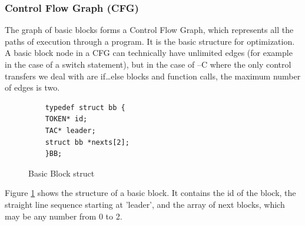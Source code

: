 \documentclass[12pt]{article}
\begin{document}
\subsubsection{Control Flow Graph (CFG)}
The graph of basic blocks forms a Control Flow Graph\supercite{cfg}, which represents all the paths of execution through a program. It is the basic structure for optimization. A basic block node in a CFG can technically have unlimited edges (for example in the case of a switch statement),
but in the case of --C where the only control transfers we deal with are if\dots else blocks and function calls, the maximum number of edges is two. 
\begin{figure}[H]
  \begin{verbatim}
    typedef struct bb {
    TOKEN* id; 
    TAC* leader;
    struct bb *nexts[2];
    }BB;
  \end{verbatim}
  \caption{Basic Block struct}
  \label{bb}
\end{figure}
Figure \ref{bb} shows the structure of a basic block. It contains the id of the block, the straight line sequence starting at 'leader', and the array of next blocks, which may be any number from 0 to 2.
\end{document}
